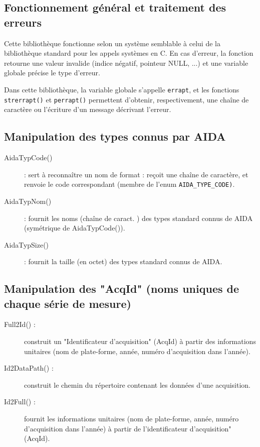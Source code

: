 \subsection{Fonctionnement général et traitement des erreurs}
  Cette bibliothèque fonctionne selon un système semblable à 
celui de la bibliothèque standard pour les appels systèmes en C. En cas
d'erreur, la fonction retourne une valeur invalide (indice
négatif, pointeur NULL, ...) et une variable globale 
précise le type d'erreur.

  Dans cette bibliothèque, la variable globale s'appelle \texttt{errapt},
et les fonctions \texttt{strerrapt()} et \texttt{perrapt()} permettent
d'obtenir, respectivement, une chaîne de caractère ou 
l'écriture d'un message décrivant l'erreur.

\subsection{Manipulation des types connus par AIDA}
\begin{description}
  \item[AidaTypCode()] : sert à reconnaître un nom de format : reçoit une
    chaîne de caractère, et renvoie le code correspondant (membre de l'enum
    \texttt{AIDA\_TYPE\_CODE)}.
  \item[AidaTypNom()] : fournit les noms (chaîne de caract. ) des types
    standard connus de AIDA (symétrique de AidaTypCode()).
  \item[AidaTypSize()] : fournit la taille (en octet) des types standard
    connus de AIDA.
\end{description}

\subsection{Manipulation des "AcqId" (noms uniques de chaque série de mesure)}
\begin{description}
  \item[Full2Id() :] construit un "Identificateur d'acquisition" (AcqId)
à partir des informations unitaires (nom de plate-forme, année, numéro
d'acquisition dans l'année).
  \item[Id2DataPath() :] construit le chemin du répertoire contenant les
données d'une acquisition.
  \item[Id2Full() :] fournit les informations unitaires (nom de plate-forme,
 année, numéro d'acquisition dans l'année) à partir de l'identificateur
d'acquisition" (AcqId).
\end{description}

